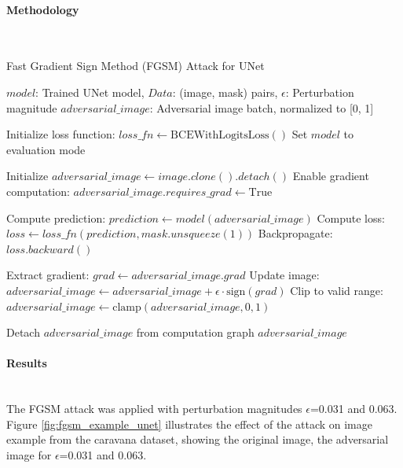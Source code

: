 \documentclass[../main.tex]{subfiles}
\begin{document}
\paragraph{Methodology}\leavevmode\\

\begin{breakablealgorithm}{Fast Gradient Sign Method (FGSM) Attack for UNet}
\begin{algorithmic}[1]
\Require $model$: Trained UNet model, $Data$: (image, mask) pairs, $\epsilon$: Perturbation magnitude
\Ensure $adversarial\_image$: Adversarial image batch, normalized to [0, 1]

\State Initialize loss function: $loss\_fn \gets \text{BCEWithLogitsLoss}()$
\State Set $model$ to evaluation mode

\State Initialize $adversarial\_image \gets image.clone().detach()$
\State Enable gradient computation: $adversarial\_image.requires\_grad \gets \text{True}$

\State Compute prediction: $prediction \gets model(adversarial\_image)$
\State Compute loss: $loss \gets loss\_fn(prediction, mask.unsqueeze(1))$
\State Backpropagate: $loss.backward()$

\State Extract gradient: $grad \gets adversarial\_image.grad$
\State Update image: $adversarial\_image \gets adversarial\_image + \epsilon \cdot \text{sign}(grad)$
\State Clip to valid range: $adversarial\_image \gets \text{clamp}(adversarial\_image, 0, 1)$

\State Detach $adversarial\_image$ from computation graph
\State \Return $adversarial\_image$
\end{algorithmic}
\end{breakablealgorithm}
\paragraph{Results}\leavevmode\\

The FGSM attack was applied with perturbation magnitudes $\epsilon$=0.031 and 0.063. Figure \ref{fig:fgsm_example_unet} illustrates the effect of the attack on image example from the caravana dataset, showing the original image, the adversarial image for $\epsilon$=0.031 and 0.063.

\end{document}
